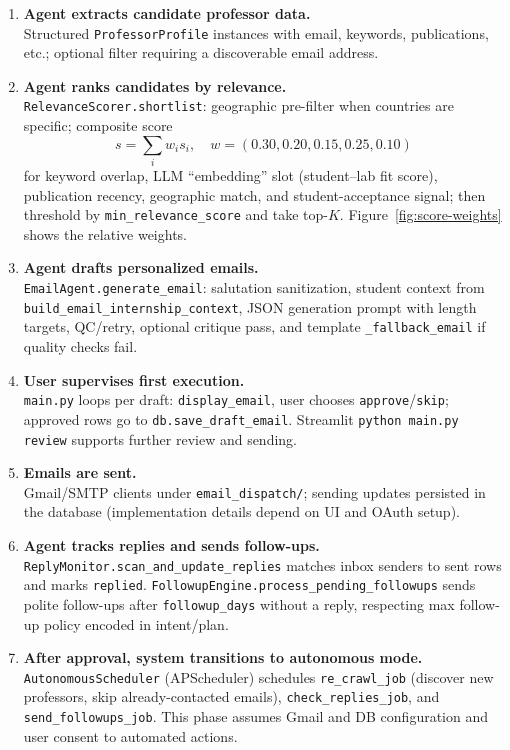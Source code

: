 \documentclass[11pt,a4paper]{article}
\begin{document}
\begin{enumerate}[leftmargin=*]
  \item \textbf{Agent extracts candidate professor data.} \\
  Structured \texttt{ProfessorProfile} instances with email, keywords, publications, etc.; optional filter requiring a discoverable email address.

  \item \textbf{Agent ranks candidates by relevance.} \\
  \texttt{RelevanceScorer.shortlist}: geographic pre-filter when countries are specific; composite score
  \begin{equation*}
    s = \sum_i w_i s_i, \quad
    w = (0.30, 0.20, 0.15, 0.25, 0.10)
  \end{equation*}
  for keyword overlap, LLM ``embedding'' slot (student--lab fit score), publication recency, geographic match, and student-acceptance signal; then threshold by \texttt{min\_relevance\_score} and take top-$K$.
  Figure~\ref{fig:score-weights} shows the relative weights.

  \item \textbf{Agent drafts personalized emails.} \\
  \texttt{EmailAgent.generate\_email}: salutation sanitization, student context from \texttt{build\_email\_internship\_context}, JSON generation prompt with length targets, QC/retry, optional critique pass, and template \texttt{\_fallback\_email} if quality checks fail.

  \item \textbf{User supervises first execution.} \\
  \texttt{main.py} loops per draft: \texttt{display\_email}, user chooses \texttt{approve}/\texttt{skip}; approved rows go to \texttt{db.save\_draft\_email}. Streamlit \texttt{python main.py review} supports further review and sending.

  \item \textbf{Emails are sent.} \\
  Gmail/SMTP clients under \texttt{email\_dispatch/}; sending updates persisted in the database (implementation details depend on UI and OAuth setup).

  \item \textbf{Agent tracks replies and sends follow-ups.} \\
  \texttt{ReplyMonitor.scan\_and\_update\_replies} matches inbox senders to sent rows and marks \texttt{replied}. \texttt{FollowupEngine.process\_pending\_followups} sends polite follow-ups after \texttt{followup\_days} without a reply, respecting max follow-up policy encoded in intent/plan.

  \item \textbf{After approval, system transitions to autonomous mode.} \\
  \texttt{AutonomousScheduler} (APScheduler) schedules \texttt{re\_crawl\_job} (discover new professors, skip already-contacted emails), \texttt{check\_replies\_job}, and \texttt{send\_followups\_job}. This phase assumes Gmail and DB configuration and user consent to automated actions.
\end{enumerate}
\end{document}
